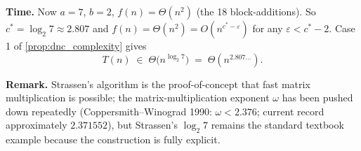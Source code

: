 \begin{example}
\medskip
\noindent\textbf{Time.} Now $a = 7$, $b = 2$, $f(n) = \Theta(n^2)$ (the 18 block-additions). So $c^* = \log_2 7 \approx 2.807$ and $f(n) = \Theta(n^2) = O(n^{c^* - \varepsilon})$ for any $\varepsilon < c^* - 2$. Case 1 of \cref{prop:dnc_complexity} gives
\[
  T(n) \;\in\; \Theta\bigl(n^{\log_2 7}\bigr) \;=\; \Theta(n^{2.807\dots}).
\]

\medskip
\noindent\textbf{Remark.} Strassen's algorithm is the proof-of-concept that fast matrix multiplication is possible; the matrix-multiplication exponent $\omega$ has been pushed down repeatedly (Coppersmith--Winograd 1990: $\omega < 2.376$; current record approximately $2.371552$), but Strassen's $\log_2 7$ remains the standard textbook example because the construction is fully explicit.
\end{example}

